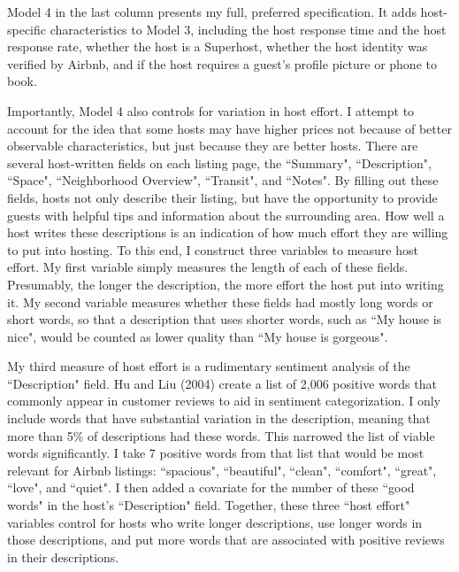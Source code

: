 Model 4 in the last column presents my full, preferred specification. It adds host-specific characteristics to Model 3, including the host response time and the host response rate, whether the host is a Superhost, whether the host identity was verified by Airbnb, and if the host requires a guest's profile picture or phone to book. 

Importantly, Model 4 also controls for variation in host effort. I attempt to account for the idea that some hosts may have higher prices not because of better observable characteristics, but just because they are better hosts. There are several host-written fields on each listing page, the ``Summary", ``Description", ``Space", ``Neighborhood Overview", ``Transit", and ``Notes". By filling out these fields, hosts not only describe their listing, but have the opportunity to provide guests with helpful tips and information about the surrounding area. How well a host writes these descriptions is an indication of how much effort they are willing to put into hosting. To this end, I construct three variables to measure host effort. My first variable simply measures the length of each of these fields. Presumably, the longer the description, the more effort the host put into writing it. My second variable measures whether these fields had mostly long words or short words, so that a description that uses shorter words, such as ``My house is nice", would be counted as lower quality than ``My house is gorgeous". 

My third measure of host effort is a rudimentary sentiment analysis of the ``Description" field. Hu and Liu (2004) create a list of 2,006 positive words that commonly appear in customer reviews to aid in sentiment categorization.\cite{hu} I only include words that have substantial variation in the description, meaning that more than 5\% of descriptions had these words. This narrowed the list of viable words significantly. I take 7 positive words from that list that would be most relevant for Airbnb listings: ``spacious", ``beautiful", ``clean", ``comfort", ``great", ``love", and ``quiet". I then added a covariate for the number of these ``good words" in the host's ``Description" field. Together, these three ``host effort" variables control for hosts who write longer descriptions, use longer words in those descriptions, and put more words that are associated with positive reviews in their descriptions. 

